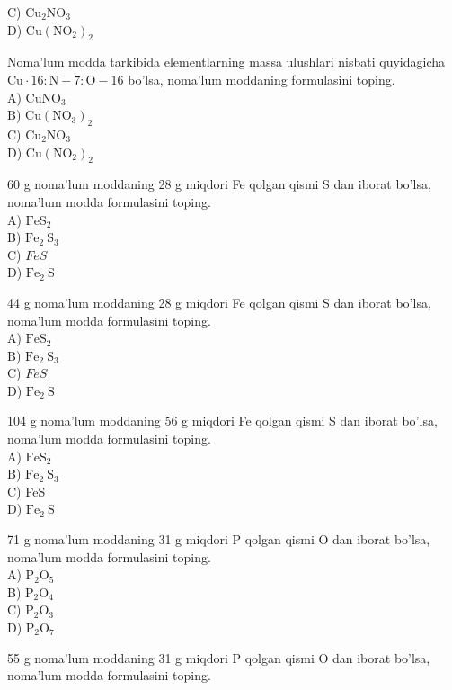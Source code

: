 C) $\mathrm{Cu}_{2} \mathrm{NO}_{3}$\\
D) $\mathrm{Cu}\left(\mathrm{NO}_{2}\right)_{2}$
  \item Noma’lum modda tarkibida elementlarning massa ulushlari nisbati quyidagicha $\mathrm{Cu} \cdot 16: \mathrm{N}-7: \mathrm{O}-16$ bo'lsa, noma'lum moddaning formulasini toping.\\
A) $\mathrm{CuNO}_{3}$\\
B) $\mathrm{Cu}\left(\mathrm{NO}_{3}\right)_{2}$\\
C) $\mathrm{Cu}_{2} \mathrm{NO}_{3}$\\
D) $\mathrm{Cu}\left(\mathrm{NO}_{2}\right)_{2}$
  \item 60 g noma'lum moddaning 28 g miqdori Fe qolgan qismi S dan iborat bo'lsa, noma'lum modda formulasini toping.\\
A) $\mathrm{FeS}_{2}$\\
B) $\mathrm{Fe}_{2} \mathrm{~S}_{3}$\\
C) $FeS$\\
D) $\mathrm{Fe}_{2} \mathrm{~S}$\\
  \item 44 g noma'lum moddaning 28 g miqdori Fe qolgan qismi S dan iborat bo'lsa, noma'lum modda formulasini toping.\\
A) $\mathrm{FeS}_{2}$\\
B) $\mathrm{Fe}_{2} \mathrm{~S}_{3}$\\
C) $FeS$\\
D) $\mathrm{Fe}_{2} \mathrm{~S}$
  \item 104 g noma'lum moddaning 56 g miqdori Fe qolgan qismi S dan iborat bo'lsa, noma'lum modda formulasini toping.\\
A) $\mathrm{FeS}_{2}$\\
B) $\mathrm{Fe}_{2} \mathrm{~S}_{3}$\\
C) FeS\\
D) $\mathrm{Fe}_{2} \mathrm{~S}$
  \item 71 g noma'lum moddaning 31 g miqdori P qolgan qismi O dan iborat bo'lsa, noma'lum modda formulasini toping.\\
A) $\mathrm{P}_{2} \mathrm{O}_{5}$\\
B) $\mathrm{P}_{2} \mathrm{O}_{4}$\\
C) $\mathrm{P}_{2} \mathrm{O}_{3}$\\
D) $\mathrm{P}_{2} \mathrm{O}_{7}$
  \item 55 g noma'lum moddaning 31 g miqdori P qolgan qismi O dan iborat bo'lsa, noma'lum modda formulasini toping.\\
